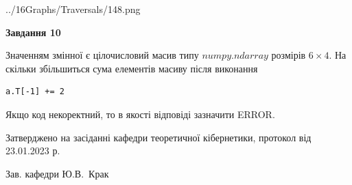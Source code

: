 \documentclass[12pt, ukrainian]{article}
\begin{document}
{\begin {large}
\begin{center}
	{../16Graphs/Traversals/148.png}
\end{center}\par
\newpage

{\begin {center}\textbf{Завдання 10}\end {center}}\par
Значенням змінної  є цілочисловий масив типу $numpy.ndarray$ розмірів $6{\times}4$. На скільки збільшиться сума елементів масиву  після виконання
\begin{verbatim}
a.T[-1] += 2
\end{verbatim}


Якщо код некоректний, то в якості відповіді зазначити ERROR.\par
\newpage


\end {large}
}
{\smallskip \begin {small} Затверджено на засіданні кафедри теоретичної кібернетики, протокол  від   23.01.2023 р.\par\smallskip\smallskip
{\parbox {6.5 cm}{Зав. кафедри \dotfill Ю.В.~Крак}} \end{small}}
\end{document}
